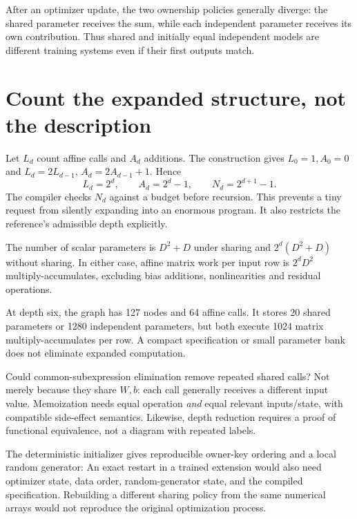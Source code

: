 After an optimizer update, the two ownership policies generally diverge:
the shared parameter receives the sum, while each independent parameter
receives its own contribution. Thus shared and initially equal independent
models are different training systems even if their first outputs match.

\section{Count the expanded structure, not the description}
Let $L_d$ count affine calls and $A_d$ additions.
The construction gives $L_0=1,A_0=0$ and
$L_d=2L_{d-1}$, $A_d=2A_{d-1}+1$. Hence
\begin{equation}
 L_d=2^d,\qquad A_d=2^d-1,\qquad N_d=2^{d+1}-1.
\end{equation}
The compiler checks $N_d$ against a budget before recursion.
This prevents a tiny request from silently expanding into an enormous
program. It also restricts the reference's admissible depth explicitly.

The number of scalar parameters is $D^2+D$ under sharing and
$2^d(D^2+D)$ without sharing. In either case, affine matrix work per
input row is $2^dD^2$ multiply-accumulates, excluding bias additions,
nonlinearities and residual operations.
\begin{center}\end{center}

At depth six, the graph has 127 nodes and 64 affine calls. It stores
20 shared parameters or 1280 independent parameters, but both execute
1024 matrix multiply-accumulates per row. A compact specification or small
parameter bank does not eliminate expanded computation.

Could common-subexpression elimination remove repeated shared calls?
Not merely because they share $W,b$: each call generally receives a
different input value. Memoization needs equal operation \emph{and}
equal relevant inputs/state, with compatible side-effect semantics.
Likewise, depth reduction requires a proof of functional equivalence,
not a diagram with repeated labels.

The deterministic initializer gives reproducible owner-key ordering and
a local random generator:
An exact restart in a trained extension would also need optimizer state,
data order, random-generator state, and the compiled specification.
Rebuilding a different sharing policy from the same numerical arrays
would not reproduce the original optimization process.

